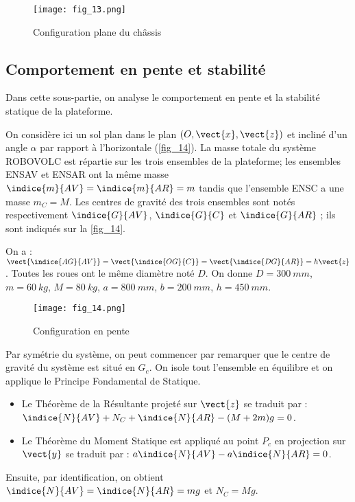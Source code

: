 \begin{figure}[H]
\centering
\texttt{[image: fig\_13.png]}
\caption{Configuration plane du châssis\label{fig_13}}
\end{figure}
\fi

\subsection{Comportement en pente et stabilité}
\begin{obj}
Dans cette sous-partie, on analyse le comportement en pente et la stabilité statique de la
plateforme.
\end{obj}


\ifprof
\else

On considère ici un sol plan dans le plan $\left(O,\vect{x},\vect{z}\right)$ et incliné d'un angle $\alpha$ par rapport à
l'horizontale (\autoref{fig_14}). La masse totale du système ROBOVOLC est répartie sur les trois
ensembles de la plateforme; les ensembles ENSAV et ENSAR ont la même masse
$\indice{m}{AV}=\indice{m}{AR}=m$ tandis que l'ensemble ENSC a une masse $m_C=M$. Les centres de gravité des
trois ensembles sont notés respectivement $\indice{G}{AV}$, $\indice{G}{C}$ et $\indice{G}{AR}$ ; ils sont indiqués sur la \autoref{fig_14}.

On a : $\vect{\indice{AG}{AV}}=\vect{\indice{OG}{C}}=\vect{\indice{DG}{AR}}=h\vect{z}$. 
Toutes les roues ont le même diamètre noté $D$.
On donne $D =\SI{300}{mm}$, $m =\SI{60}{kg}$, $M =\SI{80}{kg}$, $a =\SI{800}{mm}$, $b =\SI{200}{mm}$, $h =\SI{450}{mm}$.


\begin{figure}[H]
\centering
\texttt{[image: fig\_14.png]}
\caption{Configuration en pente \label{fig_14}}
\end{figure}
\fi

\ifprof
\begin{corrige}
Par symétrie du système, on peut commencer par remarquer que le centre de gravité du système est situé en $G_c$.
On isole tout l’ensemble en équilibre et on applique le Principe Fondamental de Statique. 
\begin{itemize}
\item Le Théorème de la Résultante projeté sur $\vect{z}$ se traduit par : $\indice{N}{AV}+N_C+\indice{N}{AR}-(M+2m)g=0$.
\item Le Théorème du Moment Statique est appliqué au point $P_c$ en projection sur $\vect{y}$ se traduit par : $a\indice{N}{AV} - a \indice{N}{AR}=0$.
\end{itemize}
Ensuite, par identification, on obtient $\indice{N}{AV}=\indice{N}{AR}=mg$ et $N_C = Mg$.

\end{corrige}
\else
\fi

